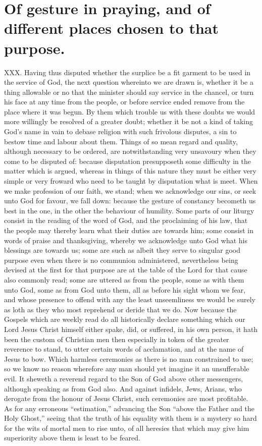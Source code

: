 \section*{Of gesture in praying, and of different places chosen to that purpose.}
XXX. Having thus disputed whether the surplice be a fit garment to be used in the service of God, the next question whereinto we are drawn is, whether it be a thing allowable or no that the minister should say service in the chancel, or turn his face at any time from the people, or before service ended remove from the place where it was begun. By them which trouble us with these doubts we would more willingly be resolved of a greater doubt; whether it be not a kind of taking God’s name in vain to debase religion with such frivolous disputes, a sin to bestow time and labour about them. Things of so mean regard and quality, although necessary to be ordered, are notwithstanding very unsavoury when they come to be disputed of: because disputation presupposeth some difficulty in the matter which is argued, whereas in things of this nature they must be either very simple or very froward who need to be taught by disputation what is meet.
When we make profession of our faith, we stand; when we acknowledge our sins, or seek unto God for favour, we fall down: because the gesture of constancy becometh us best in the one, in the other the behaviour of humility. Some parts of our liturgy consist in the reading of the word of God,  and the proclaiming of his law, that the people may thereby learn what their duties are towards him; some consist in words of praise and thanksgiving, whereby we acknowledge unto God what his blessings are towards us; some are such as albeit they serve to singular good purpose even when there is no communion administered, nevertheless being devised at the first for that purpose are at the table of the Lord for that cause also commonly read; some are uttered as from the people, some as with them unto God, some as from God unto them, all as before his sight whom we fear, and whose presence to offend with any the least unseemliness we would be surely as loth as they who most reprehend or deride that we do.
Now because the Gospels which are weekly read do all historically declare something which our Lord Jesus Christ himself either spake, did, or suffered, in his own person, it hath been the custom of Christian men then especially in token of the greater reverence to stand, to utter certain words of acclamation, and at the name of Jesus to bow. Which harmless ceremonies as there is no  man constrained to use; so we know no reason wherefore any man should yet imagine it an unsufferable evil. It sheweth a reverend regard to the Son of God above other messengers, although speaking as from God also. And against infidels, Jews, Arians, who derogate from the honour of Jesus Christ, such ceremonies are most profitable. As for any erroneous “estimation,” advancing the Son “above the Father and the Holy Ghost,” seeing that the truth of his equality with them is a mystery so hard for the wits of mortal men to rise unto, of all heresies that which may give him superiority above them is least to be feared.
